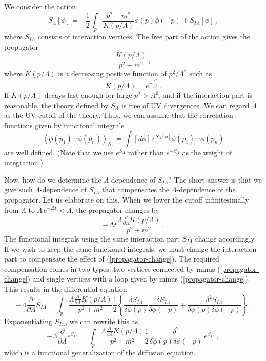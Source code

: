 \documentclass[aps,prd,preprint,groupedaddress,preprintnumbers,longbibliography]{revtex4-1}
\newcommand{\lb}{\left\lbrace}
\newcommand{\rb}{\right\rbrace}
\newcommand{\SL}{S_\Lambda}
\newcommand{\SIL}{S_{I\Lambda}}
\newcommand{\vev}[1]{\left\langle #1 \right\rangle}
\begin{document}
We consider the action
\begin{equation}
\SL [\phi] = - \frac{1}{2} \int_p \frac{p^2 + m^2}{K(p/\Lambda)} \phi
(p) \phi (-p) + \SIL [\phi]\,,
\end{equation}
where $\SIL$ consists of interaction vertices.  The free part of the
action gives the propagator
\begin{equation}
\frac{K(p/\Lambda)}{p^2 + m^2}\,,\label{K-prop}
\end{equation}
where $K(p/\Lambda)$ is a decreasing positive function of
$p^2/\Lambda^2$ such as
\begin{equation}
K (p/\Lambda) = e^{- \frac{p^2}{\Lambda^2}}\,.
\end{equation}
If $K(p/\Lambda)$ decays fast enough for large $p^2 > \Lambda^2$, and
if the interaction part is reasonable, the theory defined by
$S_\Lambda$ is free of UV divergences.  We can regard $\Lambda$ as the
UV cutoff of the theory.  Thus, we can assume that the correlation
functions given by functional integrals
\begin{equation}
\vev{\phi (p_1) \cdots \phi (p_n)}_{\SL} = \int [d\phi]\, e^{\SL [\phi]}
\phi (p_1) \cdots \phi (p_n)
\end{equation}
are well defined.  (Note that we use $e^{\SL}$ rather than $e^{-\SL}$
as the weight of integration.)

Now, how do we determine the $\Lambda$-dependence of $\SIL$?  The
short answer is that we give such $\Lambda$-dependence of $\SIL$ that
compensates the $\Lambda$-dependence of the propagator.  Let us
elaborate on this.  When we lower the cutoff infinitesimally from
$\Lambda$ to $\Lambda\, e^{-\Delta t} < \Lambda$, the propagator
changes by
\begin{equation}
- \Delta t \frac{\Lambda \frac{\partial}{\partial \Lambda}
  K(p/\Lambda)}{p^2 + m^2}\,.\label{propagator-change}
\end{equation}
The functional integrals using the same interaction part $\SIL$ change
accordingly.  If we wish to keep the same functional integrals, we
must change the interaction part to compensate the effect of
(\ref{propagator-change}).  The required compensation comes in two
types: two vertices connected by minus (\ref{propagator-change}) and
single vertices with a loop given by minus (\ref{propagator-change}).
This results in the differential equation
\begin{equation}
- \Lambda \frac{\partial}{\partial \Lambda} \SIL = \int_p
\frac{\Lambda \frac{\partial}{\partial \Lambda} K(p/\Lambda)}{p^2+m^2}
\frac{1}{2} \lb \frac{\delta \SIL}{\delta \phi (p)} \frac{\delta
  \SIL}{\delta \phi (-p)} + \frac{\delta^2 \SIL}{\delta \phi (p)
  \delta \phi (-p)}\rb\,.\label{polchinski}
\end{equation}
Exponentiating $\SIL$, we can rewrite this as
\begin{equation}
- \Lambda \frac{\partial}{\partial \Lambda} e^{\SIL} = \int_p
\frac{\Lambda \frac{\partial}{\partial \Lambda} K(p/\Lambda)}{p^2+m^2}
\frac{1}{2} \frac{\delta^2}{\delta \phi (p)
  \delta \phi (-p)} \,e^{\SIL}\,,
\end{equation}
which is a functional generalization of the diffusion equation.
\end{document}
